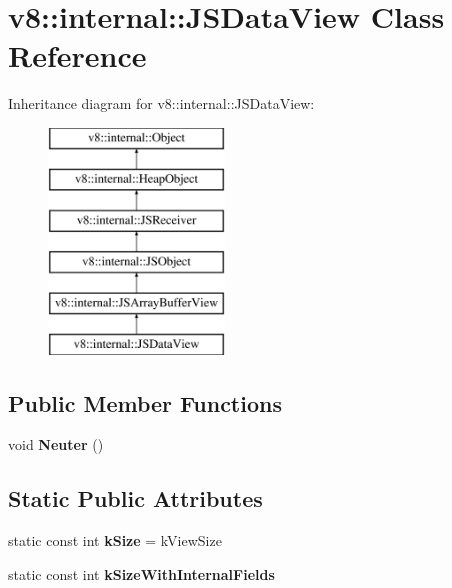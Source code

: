 \hypertarget{classv8_1_1internal_1_1_j_s_data_view}{}\section{v8\+:\+:internal\+:\+:J\+S\+Data\+View Class Reference}
\label{classv8_1_1internal_1_1_j_s_data_view}
Inheritance diagram for v8\+:\+:internal\+:\+:J\+S\+Data\+View\+:\begin{figure}[H]
\begin{center}
\leavevmode
\includegraphics[height=6.000000cm]{classv8_1_1internal_1_1_j_s_data_view}
\end{center}
\end{figure}
\subsection*{Public Member Functions}
\begin{DoxyCompactItemize}
\item 
\hypertarget{classv8_1_1internal_1_1_j_s_data_view_a57b63d7a08216e940e7f5044a964ed42}{}void {\bfseries Neuter} ()\label{classv8_1_1internal_1_1_j_s_data_view_a57b63d7a08216e940e7f5044a964ed42}

\end{DoxyCompactItemize}
\subsection*{Static Public Attributes}
\begin{DoxyCompactItemize}
\item 
\hypertarget{classv8_1_1internal_1_1_j_s_data_view_a914d13be758fc3686220d32599940b73}{}static const int {\bfseries k\+Size} = k\+View\+Size\label{classv8_1_1internal_1_1_j_s_data_view_a914d13be758fc3686220d32599940b73}

\item 
static const int {\bfseries k\+Size\+With\+Internal\+Fields}
\end{DoxyCompactItemize}
